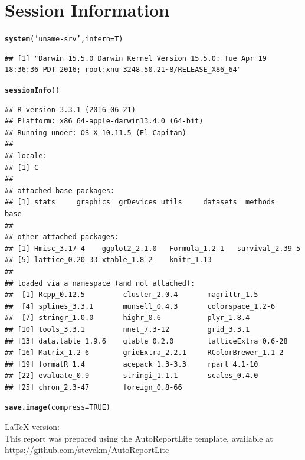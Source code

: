 \documentclass[8pt]{beamer}\usepackage[]{graphicx}\usepackage[]{color}
\makeatletter
\newcommand{\hlnum}[1]{\textcolor[rgb]{0.686,0.059,0.569}{#1}}%
\newcommand{\hlstr}[1]{\textcolor[rgb]{0.192,0.494,0.8}{#1}}%
\newcommand{\hlstd}[1]{\textcolor[rgb]{0.345,0.345,0.345}{#1}}%
\newcommand{\hlkwc}[1]{\textcolor[rgb]{0.333,0.667,0.333}{#1}}%
\newcommand{\hlkwd}[1]{\textcolor[rgb]{0.737,0.353,0.396}{\textbf{#1}}}%
\newenvironment{kframe}{%
 \def\at@end@of@kframe{}%
 \ifinner\ifhmode%
  \def\at@end@of@kframe{\end{minipage}}%
  \begin{minipage}{\columnwidth}%
 \fi\fi%
 \def\FrameCommand##1{\hskip\@totalleftmargin \hskip-\fboxsep
 \colorbox{shadecolor}{##1}\hskip-\fboxsep
     \hskip-\linewidth \hskip-\@totalleftmargin \hskip\columnwidth}%
 \MakeFramed {\advance\hsize-\width
   \@totalleftmargin\z@ \linewidth\hsize
   \@setminipage}}%
 {\par\unskip\endMakeFramed%
 \at@end@of@kframe}
\newenvironment{knitrout}{}{} %
\makeatother
\begin{document}
\section{Session Information}
\begin{knitrout}\footnotesize
{}\color{fgcolor}\begin{kframe}
\begin{alltt}
\hlkwd{system}\hlstd{(}\hlstr{'uname -srv'}\hlstd{,}\hlkwc{intern}\hlstd{=T)}
\end{alltt}
\begin{verbatim}
## [1] "Darwin 15.5.0 Darwin Kernel Version 15.5.0: Tue Apr 19 18:36:36 PDT 2016; root:xnu-3248.50.21~8/RELEASE_X86_64"
\end{verbatim}
\begin{alltt}
\hlkwd{sessionInfo}\hlstd{()}
\end{alltt}
\begin{verbatim}
## R version 3.3.1 (2016-06-21)
## Platform: x86_64-apple-darwin13.4.0 (64-bit)
## Running under: OS X 10.11.5 (El Capitan)
## 
## locale:
## [1] C
## 
## attached base packages:
## [1] stats     graphics  grDevices utils     datasets  methods   base     
## 
## other attached packages:
## [1] Hmisc_3.17-4    ggplot2_2.1.0   Formula_1.2-1   survival_2.39-5
## [5] lattice_0.20-33 xtable_1.8-2    knitr_1.13     
## 
## loaded via a namespace (and not attached):
##  [1] Rcpp_0.12.5         cluster_2.0.4       magrittr_1.5       
##  [4] splines_3.3.1       munsell_0.4.3       colorspace_1.2-6   
##  [7] stringr_1.0.0       highr_0.6           plyr_1.8.4         
## [10] tools_3.3.1         nnet_7.3-12         grid_3.3.1         
## [13] data.table_1.9.6    gtable_0.2.0        latticeExtra_0.6-28
## [16] Matrix_1.2-6        gridExtra_2.2.1     RColorBrewer_1.1-2 
## [19] formatR_1.4         acepack_1.3-3.3     rpart_4.1-10       
## [22] evaluate_0.9        stringi_1.1.1       scales_0.4.0       
## [25] chron_2.3-47        foreign_0.8-66
\end{verbatim}
\begin{alltt}
\hlkwd{save.image}\hlstd{(}\hlkwc{compress} \hlstd{=} \hlnum{TRUE}\hlstd{)}
\end{alltt}
\end{kframe}
\end{knitrout}
\scriptsize{\LaTeX{} version: \LaTeXe~ \fmtversion} \\
\scriptsize{This report was prepared using the AutoReportLite template, available at \url{https://github.com/stevekm/AutoReportLite}}

\end{document}
